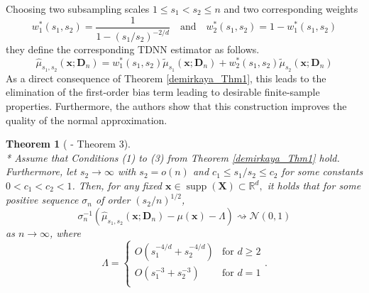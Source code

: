 \documentclass[letterpaper,10pt]{article}
\numberwithin{equation}{section}
\newtheorem{thm}{Theorem}
\numberwithin{thm}{section}
\numberwithin{lem}{section}
\numberwithin{cor}{section}
\renewcommand{\hat}{\widehat}
\newcommand{\1}{\mathbb{1}}
\begin{document}
Choosing two subsampling scales $1 \leq s_1 < s_2 \leq n$ and two corresponding weights
\begin{equation}
	w_1^{*}(s_1, s_2) = \frac{1}{1-(s_1/s_2)^{-2/d}}
	\quad\text{and}\quad
	w_2^{*}(s_1, s_2) = 1 - w_1^{*}(s_1, s_2)
\end{equation}
they define the corresponding TDNN estimator as follows.
\begin{equation}
	\hat{\mu}_{s_1, s_2}\left(\mathbf{x}; \mathbf{D}_n\right)
	= w_1^{*}(s_1, s_2)\tilde{\mu}_{s_1}\left(\mathbf{x}; \mathbf{D}_n\right) + w_2^{*}(s_1, s_2)\tilde{\mu}_{s_2}\left(\mathbf{x}; \mathbf{D}_n\right)
\end{equation}
As a direct consequence of Theorem \ref{demirkaya_Thm1}, this leads to the elimination of the first-order bias term leading to desirable finite-sample properties.
Furthermore, the authors show that this construction improves the quality of the normal approximation.


\begin{thm}[\citet{demirkaya_optimal_2024} - Theorem 3]\label{demirkaya_Thm3}\mbox{}\\*
	Assume that Conditions (1) to (3) from Theorem \ref{demirkaya_Thm1} hold.
	Furthermore, let $s_2 \rightarrow \infty$ with $s_2 = o(n)$ and $c_1 \leq s_1/s_2 \leq c_2$ for some constants $0 < c_1 < c_2 < 1$.
	Then, for any fixed $\mathbf{x} \in \operatorname{supp}(\mathbf{X}) \subset \mathbb{R}^d,$ it holds that for some positive sequence $\sigma_n$ of order $(s_2/n)^{1/2}$,
	\begin{equation}
		\sigma_n^{-1} \left(\hat{\mu}_{s_1, s_2}\left(\mathbf{x}; \mathbf{D}_n\right) - \mu(\mathbf{x}) - \Lambda\right) \rightsquigarrow \mathcal{N}(0,1)
	\end{equation}
	as $n \rightarrow \infty$, where
	\begin{equation*}
		\Lambda = \begin{cases}
			O\left(s_1^{-4/d} + s_2^{-4/d}\right) & \text{for } d \geq 2 \\
			O\left(s_1^{-3} + s_2^{-3}\right)     & \text{for } d = 1    \\
		\end{cases}.
	\end{equation*}
\end{thm}
\end{document}
